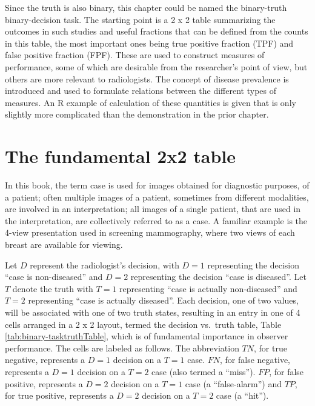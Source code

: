 \documentclass[
]{book}
\begin{document}
Since the truth is also binary, this chapter could be named the binary-truth binary-decision task. The starting point is a 2 x 2 table summarizing the outcomes in such studies and useful fractions that can be defined from the counts in this table, the most important ones being true positive fraction (TPF) and false positive fraction (FPF). These are used to construct measures of performance, some of which are desirable from the researcher's point of view, but others are more relevant to radiologists. The concept of disease prevalence is introduced and used to formulate relations between the different types of measures. An R example of calculation of these quantities is given that is only slightly more complicated than the demonstration in the prior chapter.

\hypertarget{binary-taskTruth}{%
\section{The fundamental 2x2 table}\label{binary-taskTruth}}

In this book, the term case is used for images obtained for diagnostic purposes, of a patient; often multiple images of a patient, sometimes from different modalities, are involved in an interpretation; all images of a single patient, that are used in the interpretation, are collectively referred to as a case. A familiar example is the 4-view presentation used in screening mammography, where two views of each breast are available for viewing.

Let \(D\) represent the radiologist's decision, with \(D=1\) representing the decision ``case is non-diseased'' and \(D=2\) representing the decision ``case is diseased''. Let \(T\) denote the truth with \(T=1\) representing ``case is actually non-diseased'' and \(T=2\) representing ``case is actually diseased''. Each decision, one of two values, will be associated with one of two truth states, resulting in an entry in one of 4 cells arranged in a 2 x 2 layout, termed the decision vs.~truth table, Table \ref{tab:binary-tasktruthTable}, which is of fundamental importance in observer performance. The cells are labeled as follows. The abbreviation \(TN\), for true negative, represents a \(D=1\) decision on a \(T=1\) case. \(FN\), for false negative, represents a \(D=1\) decision on a \(T=2\) case (also termed a ``miss''). \(FP\), for false positive, represents a \(D=2\) decision on a \(T=1\) case (a ``false-alarm'') and \(TP\), for true positive, represents a \(D=2\) decision on a \(T=2\) case (a ``hit'').
\end{document}
